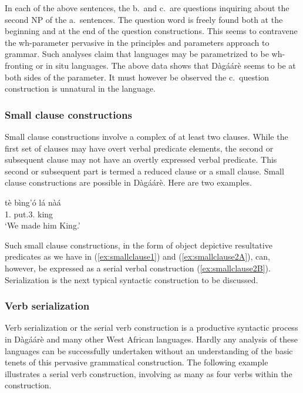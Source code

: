 \begin{refsection}
In each of the above sentences, the b.\ and c.\ are questions inquiring about the second NP of
the a.\ sentences. The question word is freely found both at the beginning and at the end of the
question constructions. This seems to contravene the wh-parameter pervasive in the principles
and parameters approach to grammar. Such analyses claim that languages may be
parametrized to be wh-fronting or in situ languages. The above data shows that Dàgáárè seems to be at both sides of the parameter. It must however be observed the c.\ question
construction is unnatural in the language.

\subsubsection{Small clause constructions}
Small clause constructions involve a complex of at least two clauses. While the first
set of clauses may have overt verbal predicate elements, the second or subsequent clause may
not have an overtly expressed verbal predicate. This second or subsequent part is termed a
reduced clause or a small clause. Small clause constructions are possible in Dàgáárè. Here
are two examples.


\ea\label{ex:smallclause1} \gll tè bìng’ó lá nàá\\
1.{\PL} put.3.{\SG} {\FOC} king\\
\glt ‘We made him King.’\z

\ea {}
\z\z

Such small clause constructions, in the form of object depictive resultative predicates as we
have in (\ref{ex:smallclause1}) and (\ref{ex:smallclause2A}), can, however, be expressed as a serial verbal construction (\ref{ex:smallclause2B}).
Serialization is the next typical syntactic construction to be discussed.

\subsubsection{Verb serialization}
Verb serialization or the serial verb construction is a productive syntactic process in
Dàgáárè and many other West African languages. Hardly any analysis of these languages
can be successfully undertaken without an understanding of the basic tenets of this pervasive
grammatical construction. The following example illustrates a serial verb construction,
involving as many as four verbs within the construction.




\end{refsection}
